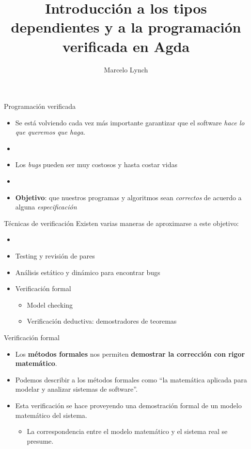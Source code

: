 \documentclass[11pt]{beamer}
\title[Tipos dependientes y Agda]{Introducción a los tipos dependientes y a la programación verificada en Agda}
\author{Marcelo Lynch}
\institute[ITBA]{Instituto Tecnológico de Buenos Aires}
\newcommand{\bit}{\begin{itemize}\setlength\itemsep{1em}}
\newcommand{\eit}{\end{itemize}}
\begin{document}
\begin{frame}
\titlepage
\end{frame}


\begin{frame}{Programación verificada}
\begin{itemize}
\item Se está volviendo cada vez más importante garantizar que el software \textit{hace lo que queremos que haga}.
\item[]
\item Los \textit{bugs} pueden ser muy costosos y hasta costar vidas 
\item[]
\item \textbf{Objetivo}: que nuestros programas y algoritmos sean \textit{correctos} de acuerdo a alguna \textit{especificación}
\end{itemize}
\end{frame}

\begin{frame}{Técnicas de verificación}
Existen varias maneras de aproximarse a este objetivo: \\

\begin{itemize}
\setlength\itemsep{1em}
\item[]
\item Testing y revisión de pares
\item Análisis estático y dinámico para encontrar bugs
\item Verificación formal
\begin{itemize}
\item Model checking
\item Verificación deductiva: demostradores de teoremas
\end{itemize}
\end{itemize}
\end{frame}

\begin{frame}{Verificación formal}
\bit 
\setlength\itemsep{1em}
\item Los \textbf{métodos formales} nos permiten \textbf{demostrar la corrección con rigor matemático}. 

\item Podemos describir a los métodos formales como ``la matemática aplicada para modelar y analizar sistemas de software''.

\item Esta verificación se hace proveyendo una demostración formal de un modelo matemático del sistema.
\bit
\item La correspondencia entre el modelo matemático y el sistema real se presume.
\eit
\eit

\end{frame}
\end{document}
